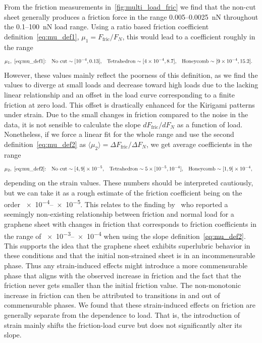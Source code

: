 From the friction measurements in~\cref{fig:multi_load_fric} we find that the
non-cut sheet generally produces a friction force in the range 0.005--\SI{0.0025}{nN} throughout the 0.1--\SI{100}{nN} load range. Using a ratio based friction coefficient definition~\cref{eq:mu_def1}, $\mu_1 = F_{\text{fric}}/{F_N}$, this would lead to a coefficient roughly in the range
\begin{align*}
  &\mu_1,  \ \text{\cref{eq:mu_def1}:}& &\text{No cut}\sim [\num{e-4}, 0.13],&  &\text{Tetrahedron}\sim [\num{4e-4},8.7],& &\text{Honeycomb}\sim [\num{9e-4}, 15.2].&
\end{align*}
However, these values mainly reflect the poorness of this definition, as we find the values to diverge at small loads and decrease toward high loads due to the lacking linear relationship and an offset in the load curve corresponding to a finite friction at zero load. This offset is drastically enhanced for the Kirigami patterns under strain. Due to the small changes in friction compared to the noise in the data, it is not sensible to calculate the slope $dF_{\text{fric}}/dF_N$ as a function of load. Nonetheless, if we force a linear fit for the whole range and use the second definition~\cref{eq:mu_def2} as $\langle \mu_2 \rangle = \Delta F_{\text{fric}}/\Delta F_N$, we get average coefficients in the range
\begin{align*}
  &\mu_2,  \ \text{\cref{eq:mu_def2}:}& &\text{No cut} \sim [4, 9]\times \num{e-5},&  &\text{Tetrahedron} \sim 5\times[\num{e-5}, \num{e-4}],& &\text{Honeycomb} \sim [1,9]\times \num{e-4},&
\end{align*}
depending on the strain values. These numbers should be interpreted cautiously,
but we can take it as a rough estimate of the friction coefficient being on the
order \num{e-4}--\num{e-5}. This relates to the finding
by~\cite{DIENWIEBEL2005197} who reported a seemingly non-existing relationship
between friction and normal load for a graphene sheet with changes in friction
that corresponds to friction coefficients in the range of \num{e-3}--\num{e-4} when
using the slope definition~\cref{eq:mu_def2}. This supports the idea that the
graphene sheet exhibits superlubric behavior in these conditions and that the initial non-strained sheet is in an incommensurable
phase. Thus any strain-induced effects might introduce a more
commensurable phase that aligns with the observed increase in friction
and the fact that the friction never gets smaller than the initial friction
value. The non-monotonic increase in friction can then be attributed to transitions in and out of commensurable phases. We found that these strain-induced effects on friction are generally separate from the dependence to load. That is, the introduction of strain mainly shifts the friction-load curve but does not significantly alter its slope.  

